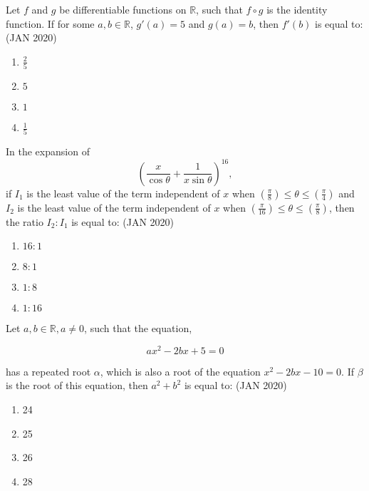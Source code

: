    \item Let \( f \) and \( g \) be differentiable functions on \( \mathbb{R} \), such that \( f \circ g \) is the identity function. If for some \( a, b \in \mathbb{R} \), \( g'(a) = 5 \) and \( g(a) = b \), then \( f'(b) \) is equal to: \hfill{(JAN 2020)}
        \begin{multicols}{4}
        \begin{enumerate}
            \item \( \frac{2}{5} \)  
            \item \( 5 \)  
            \item \( 1 \)  
            \item \( \frac{1}{5} \)
        \end{enumerate}
        \end{multicols}

    \item In the expansion of 
    \[
    \left( \frac{x}{\cos \theta} + \frac{1}{x \sin \theta} \right)^{16},
    \]
    if \( I_1 \) is the least value of the term independent of \( x \) when \( \left( \frac{\pi}{8} \right) \leq \theta \leq \left( \frac{\pi}{4} \right) \) and \( I_2 \) is the least value of the term independent of \( x \) when \( \left( \frac{\pi}{16} \right) \leq \theta \leq \left( \frac{\pi}{8} \right) \), then the ratio \( I_2 : I_1 \) is equal to: \hfill{(JAN 2020)}
        \begin{multicols}{4}
        \begin{enumerate}
            \item \( 16:1 \)  
            \item \( 8:1 \)  
            \item \( 1:8 \)  
            \item \( 1:16 \)
        \end{enumerate}
        \end{multicols}
        
    \item Let $a,b\in\mathbb{R}, a\neq0$, such that the equation,

        \[ax^2-2bx+5=0\]
        
        has a repeated root $\alpha$, which is also a root of the equation $x^2-2bx-10=0$. If $\beta$ is the root of this equation, then $a^2+b^2$ is equal to: \hfill{(JAN 2020)}
        
        \begin{enumerate}
        \item 24
        \item 25
        \item 26
        \item 28
        \end{enumerate}
           
